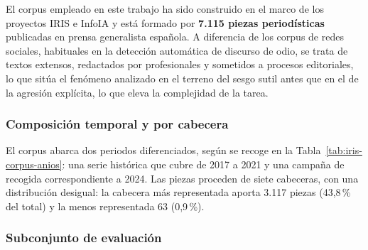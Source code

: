 
El corpus empleado en este trabajo ha sido construido en el marco de los proyectos
IRIS e InfoIA y está formado por \textbf{7.115 piezas periodísticas} publicadas en prensa
generalista española. A diferencia de los corpus de redes sociales, habituales
en la detección automática de discurso de odio, se trata de textos extensos, redactados por
profesionales y sometidos a procesos editoriales, lo que sitúa el fenómeno
analizado en el terreno del sesgo sutil antes que en el de la agresión
explícita, lo que eleva la complejidad de la tarea.

\subsubsection{Composición temporal y por cabecera}

El corpus abarca dos periodos diferenciados, según se recoge en la
Tabla~\ref{tab:iris-corpus-anios}: una serie histórica que cubre de 2017 a 2021
y una campaña de recogida correspondiente a 2024. Las piezas proceden de siete cabeceras, con una distribución desigual: la
cabecera más representada aporta 3.117 piezas (43,8\,\% del total) y la menos
representada 63 (0,9\,\%).

\begin{table}[H]
    \centering
    \begingroup
    \small
    \endgroup
\end{table}





\subsubsection{Subconjunto de evaluación}
\label{subsec:iris_subconjunto}

